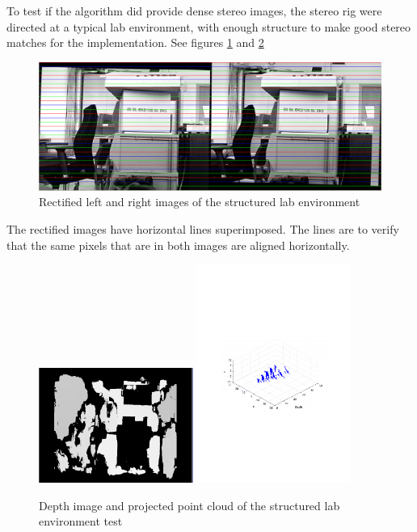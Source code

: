 To test if the algorithm did provide dense stereo images, the stereo rig were directed at
a typical lab environment, with enough structure to make good stereo matches for the
implementation. See figures \ref{chap8:fig-structured-test-rectified} and
\ref{chap8:fig-structured-test-depth}
\begin{figure}[htbp]
    \centering
    \includegraphics[width=\textwidth]{pics/structure-test-rectified}
    \caption{Rectified left and right images of the structured lab environment}
    \label{chap8:fig-structured-test-rectified}
\end{figure}
The rectified images have horizontal lines superimposed. The lines are to verify that the same
pixels that are in both images are aligned horizontally.
\begin{figure}[htbp]
    \centering
    \includegraphics[width=0.45\textwidth]{pics/structure-test-depth}
    \includegraphics[width=0.45\textwidth]{pics/structured-test3d}
    \caption{Depth image and projected point cloud of the structured lab environment test}
    \label{chap8:fig-structured-test-depth}
\end{figure}
